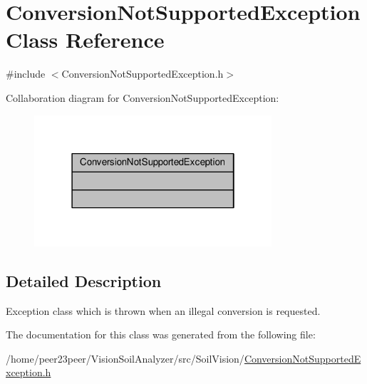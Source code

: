 \hypertarget{class_conversion_not_supported_exception}{}\section{Conversion\+Not\+Supported\+Exception Class Reference}
\label{class_conversion_not_supported_exception}


{\ttfamily \#include $<$Conversion\+Not\+Supported\+Exception.\+h$>$}



Collaboration diagram for Conversion\+Not\+Supported\+Exception\+:\nopagebreak
\begin{figure}[H]
\begin{center}
\leavevmode
\includegraphics[width=250pt]{class_conversion_not_supported_exception__coll__graph}
\end{center}
\end{figure}


\subsection{Detailed Description}
Exception class which is thrown when an illegal conversion is requested. 

The documentation for this class was generated from the following file\+:\begin{DoxyCompactItemize}
\item 
/home/peer23peer/\+Vision\+Soil\+Analyzer/src/\+Soil\+Vision/\hyperlink{_conversion_not_supported_exception_8h}{Conversion\+Not\+Supported\+Exception.\+h}\end{DoxyCompactItemize}
